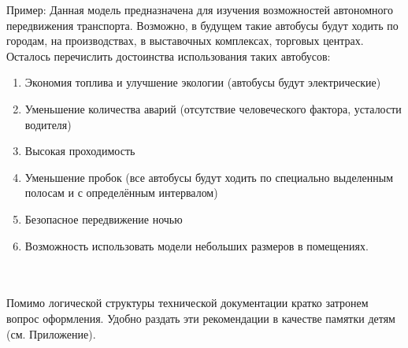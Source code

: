Пример: Данная модель предназначена для изучения возможностей автономного передвижения транспорта. Возможно, в будущем такие автобусы будут ходить по городам, на производствах, в выставочных комплексах, торговых центрах.
Осталось перечислить достоинства использования таких автобусов:
\begin{enumerate}
	\item Экономия топлива и улучшение экологии (автобусы будут электрические)
	\item Уменьшение количества аварий (отсутствие человеческого фактора, усталости водителя)
	\item Высокая проходимость
	\item Уменьшение пробок (все автобусы будут ходить по специально выделенным полосам и с определённым интервалом) 
	\item Безопасное передвижение ночью 
	\item Возможность использовать модели небольших размеров в помещениях.
\end{enumerate}

{\hypertarget{lesson29x3}{}}\\\\

Помимо логической структуры технической документации кратко затронем вопрос оформления. Удобно раздать эти рекомендации в качестве памятки детям (см. Приложение).

